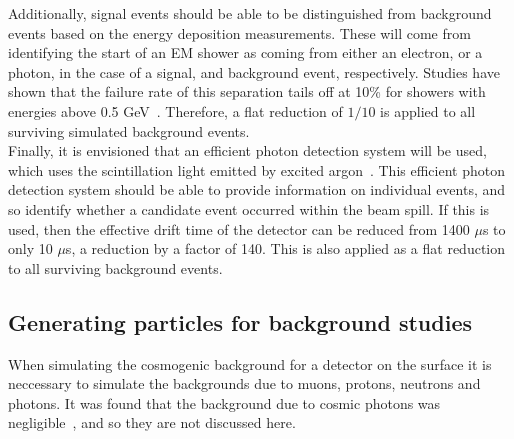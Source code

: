 Additionally, signal events should be able to be distinguished from background events based on the energy deposition measurements. These will come from identifying the start of an EM shower as coming from either an electron, or a photon, in the case of a signal, and background event, respectively. Studies have shown that the failure rate of this separation tails off at 10\% for showers with energies above 0.5 GeV~\citep{LBNE8458}. Therefore, a flat reduction of $1/10$ is applied to all surviving simulated background events. \\

Finally, it is envisioned that an efficient photon detection system will be used, which uses the scintillation light emitted by excited argon~\citep{PhysRevB.27.5279}. This efficient photon detection system should be able to provide information on individual events, and so identify whether a candidate event occurred within the beam spill. If this is used, then the effective drift time of the detector can be reduced from 1400 $\mu$s to only 10 $\mu$s, a reduction by a factor of 140. This is also applied as a flat reduction to all surviving background events. \\


\subsection{Generating particles for background studies}
When simulating the cosmogenic background for a detector on the surface it is neccessary to simulate the backgrounds due to muons, protons, neutrons and photons. It was found that the background due to cosmic photons was negligible~\citep{MartinsThesis}, and so they are not discussed here. \\

